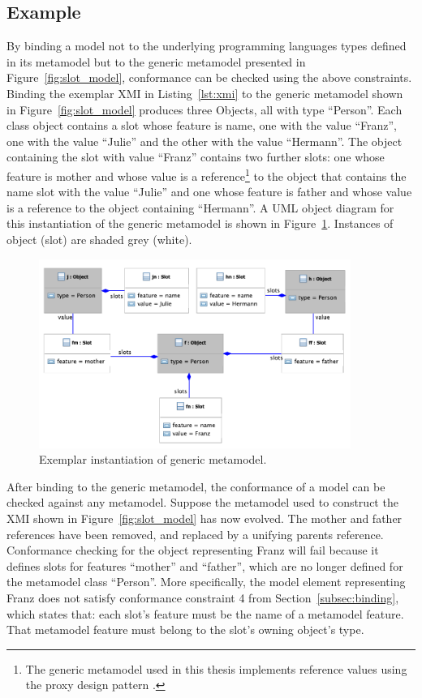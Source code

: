\subsection{Example}
\label{subsec:mmi_syntax_example}
By binding a model not to the underlying programming languages types defined in its metamodel but to the generic metamodel presented in Figure~\ref{fig:slot_model}, conformance can be checked using the above constraints. Binding the exemplar XMI in Listing~\ref{lst:xmi} to the generic metamodel shown in Figure~\ref{fig:slot_model} produces three Objects, all with type ``Person''. Each class object contains a slot whose feature is name, one with the value ``Franz'', one with the value ``Julie'' and the other with the value ``Hermann''. The object containing the slot with value ``Franz'' contains two further slots: one whose feature is mother and whose value is a reference\footnote{The generic metamodel used in this thesis implements reference values using the proxy design pattern \cite{gamma95patterns}.} to the object that contains the name slot with the value ``Julie'' and one whose feature is father and whose value is a reference to the object containing ``Hermann''. A UML object diagram for this instantiation of the generic metamodel is shown in Figure~\ref{fig:generic_binding}. Instances of object (slot) are shaded grey (white).

\begin{figure}[htbp]
  \centering
  \includegraphics[width=4in]{5.Implementation/GenericBinding.pdf}
  \caption{Exemplar instantiation of generic metamodel.}
  \label{fig:generic_binding}
\end{figure}

After binding to the generic metamodel, the conformance of a model can be checked against any metamodel. Suppose the metamodel used to construct the XMI shown in Figure~\ref{fig:slot_model} has now evolved. The mother and father references have been removed, and replaced by a unifying parents reference. Conformance checking for the object representing Franz will fail because it defines slots for features ``mother'' and ``father'', which are no longer defined for the metamodel class ``Person''. More specifically, the model element representing Franz does not satisfy conformance constraint 4 from Section~\ref{subsec:binding}, which states that: each slot's feature must be the name of a metamodel feature. That metamodel feature must belong to the slot's owning object's type. 

